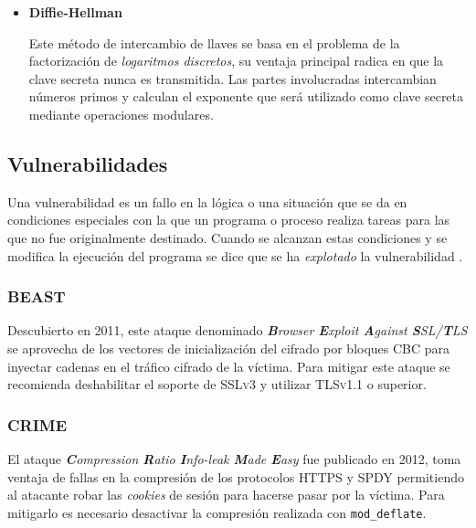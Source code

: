       \begin{itemize}

        \item \textbf {Diffie-Hellman}

Este m\'{e}todo de intercambio de llaves se basa en el problema de la factorizaci\'{o}n de \emph{logaritmos discretos}, su ventaja principal radica en que la clave secreta nunca es transmitida. Las partes involucradas intercambian n\'{u}meros primos y calculan el exponente que ser\'{a} utilizado como clave secreta mediante operaciones modulares\cite{_samplesections.pdf_????}.

      \end{itemize}

  \subsection {Vulnerabilidades}

Una vulnerabilidad es un fallo en la l\'{o}gica o una situaci\'{o}n que se da en condiciones especiales con la que un programa o proceso realiza tareas para las que no fue originalmente destinado. Cuando se alcanzan estas condiciones y se modifica la ejecuci\'{o}n del programa se dice que se ha \textit{explotado} la vulnerabilidad \cite{padilla_buenas_2009}.

        \subsubsection{BEAST}

Descubierto en 2011, este ataque denominado \emph{\textbf{B}rowser \textbf{E}xploit \textbf{A}gainst \textbf{S}SL/\textbf{T}LS} se aprovecha de los vectores de inicializaci\'{o}n del cifrado por bloques \textsc{CBC} para inyectar cadenas en el tr\'{a}fico cifrado de la v\'{i}ctima\cite{_beast.pdf_????}. Para mitigar este ataque se recomienda deshabilitar el soporte de \textsc{SSLv3} y utilizar \textsc{TLSv1.1} o superior\cite{_ssl_????-2}.

        \subsubsection{CRIME}

El ataque \emph{\textbf{C}ompression \textbf{R}atio \textbf{I}nfo-leak \textbf{M}ade \textbf{E}asy} fue publicado en 2012, toma ventaja de fallas en la compresi\'{o}n de los protocolos \textsc{\gls{HTTPS}} y \textsc{SPDY} permitiendo al atacante robar las \emph{cookies} de sesi\'{o}n para hacerse pasar por la v\'{i}ctima. Para mitigarlo es necesario desactivar la compresi\'{o}n realizada con \texttt{mod\_deflate}\cite{goodin_crack_2012}.

